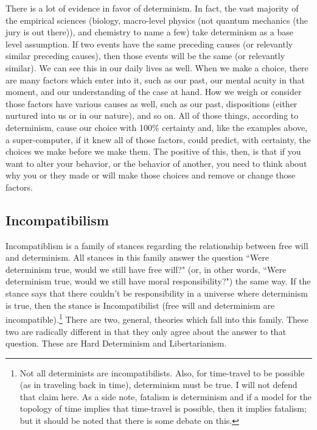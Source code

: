 There is a lot of evidence in favor of determinism. In fact, the vast majority of the empirical sciences (biology, macro-level physics (not quantum mechanics (the jury is out there)), and chemistry to name a few) take determinism as a base level assumption. If two events have the same preceding causes (or relevantly similar preceding causes), then those events will be the same (or relevantly similar). We can see this in our daily lives as well. When we make a choice, there are many factors which enter into it, such as our past, our mental acuity in that moment, and our understanding of the case at hand. How we weigh or consider those factors have various causes as well, such as our past, dispositions (either nurtured into us or in our nature), and so on. All of those things, according to determinism, cause our choice with 100\% certainty and, like the examples above, a super-computer, if it knew all of those factors, could predict, with certainty, the choices we make before we make them. The positive of this, then, is that if you want to alter your behavior, or the behavior of another, you need to think about why you or they made or will make those choices and remove or change those factors.  

\subsection{Incompatibilism}

Incompatiblism is a family of stances regarding the relationship between free will and determinism. All stances in this family answer the question ``Were determinism true, would we still have free will?" (or, in other words, ``Were determinism true, would we still have moral responsibility?") the same way. If the stance says that there couldn't be responsibility in a universe where determinism is true, then the stance is Incompatibilist (free will and determinism are incompatible).\footnote{Not all determinists are incompatibilists. Also, for time-travel to be possible (as in traveling back in time), determinism must be true.  I will not defend that claim here. As a side note, fatalism is determinism and if a model for the topology of time implies that time-travel is possible, then it implies fatalism; but it should be noted that there is some debate on this.} There are two, general, theories which fall into this family. These two are radically different in that they only agree about the answer to that question. These are Hard Determinism and Libertarianism. 

